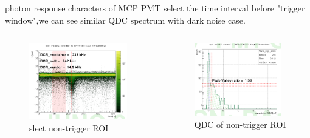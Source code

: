 \documentclass[11pt,compress,xcolor=x11names,UTF8]{beamer}
\begin{document}
\begin{frame}{photon response characters of MCP PMT }
select the time interval before "trigger window",we can see similar QDC spectrum with dark noise case.
\begin{columns}
\begin{column}{.495\textwidth}
\begin{figure}
\centering
\includegraphics[width=0.94\textwidth]{figure/roiwave.png} %
\caption{slect non-trigger ROI}
\end{figure}
\end{column}
\begin{column}{.475\textwidth}
\begin{figure}
\centering
\includegraphics[width=0.94\textwidth]{figure/roiqdc.png} %
\caption{QDC of non-trigger ROI}
\end{figure}
\end{column}
\end{columns}
\end{frame}
\end{document}

